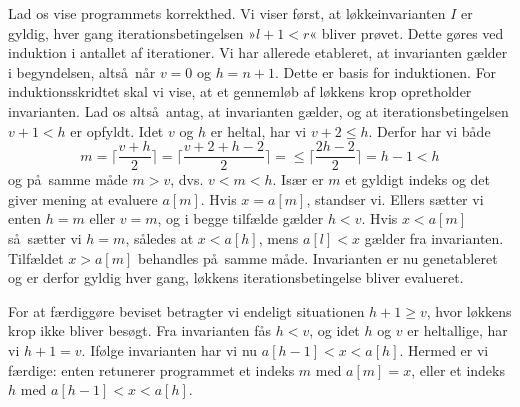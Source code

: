 %
Lad os vise programmets korrekthed.
Vi viser først, at løkkeinvarianten $I$ er gyldig, hver gang iterationsbetingelsen »$l+1<r$« bliver prøvet.
Dette gøres ved induktion i antallet af iterationer.
Vi har allerede etableret, at invarianten gælder i begyndelsen, altså når $v=0$ og $h=n+1$.
Dette er basis for induktionen.
For induktionsskridtet skal vi vise, at et gennemløb af løkkens krop opretholder invarianten.
Lad os altså antag, at invarianten gælder, og at iterationsbetingelsen $v+1<h$ er opfyldt.
Idet $v$ og $h$ er heltal, har vi $v+2\leq h$.
Derfor har vi både
\[
  m=\lceil \frac{v + h}{2}\rceil
  = \lceil \frac{v + 2 + h- 2}{2}\rceil =
  \leq \lceil \frac{2h - 2}{2}\rceil = h - 1 < h
\]
og på samme måde $m > v$, dvs. $v<m< h$.
Især er $m$ et gyldigt indeks og det giver mening at evaluere $a[m]$.
Hvis $x= a[m]$, standser vi.
Ellers sætter vi enten $h=m$ eller $v=m$, og i begge tilfælde gælder $h<v$.
Hvis $x<a[m]$ så sætter vi $h=m$, således at $x<a[h]$, mens $a[l]<x$ gælder fra invarianten.
Tilfældet $x>a[m]$ behandles på samme måde.
Invarianten er nu genetableret og er derfor gyldig hver gang, løkkens iterationsbetingelse bliver evalueret.

For at færdiggøre beviset betragter vi endeligt situationen $h+1\geq v$, hvor løkkens krop ikke bliver besøgt.
Fra invarianten fås $h< v$, og idet $h$ og $v$ er heltallige, har vi $h+1  =v$.
Ifølge invarianten har vi nu $a[h-1] < x <a[h]$.
Hermed er vi færdige: enten retunerer programmet et indeks $m$ med $a[m]=x$, eller et indeks $h$ med $a[h-1]< x<a[h]$.


